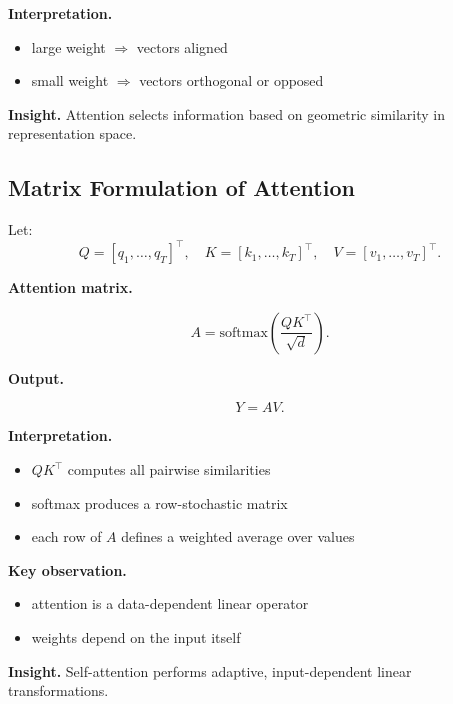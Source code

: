 \medskip

\noindent
\textbf{Interpretation.}

\begin{itemize}
    \item large weight $\Rightarrow$ vectors aligned
    \item small weight $\Rightarrow$ vectors orthogonal or opposed
\end{itemize}

\medskip

\noindent
\textbf{Insight.}  
Attention selects information based on geometric similarity in representation space.

\subsection{Matrix Formulation of Attention}

Let:
\[
Q = [q_1, \dots, q_T]^\top, \quad
K = [k_1, \dots, k_T]^\top, \quad
V = [v_1, \dots, v_T]^\top.
\]

\medskip

\noindent
\textbf{Attention matrix.}

\[
A = \text{softmax}\left( \frac{QK^\top}{\sqrt{d}} \right).
\]

\medskip

\noindent
\textbf{Output.}

\[
Y = A V.
\]

\medskip

\noindent
\textbf{Interpretation.}

\begin{itemize}
    \item $QK^\top$ computes all pairwise similarities
    \item softmax produces a row-stochastic matrix
    \item each row of $A$ defines a weighted average over values
\end{itemize}

\medskip

\noindent
\textbf{Key observation.}

\begin{itemize}
    \item attention is a data-dependent linear operator
    \item weights depend on the input itself
\end{itemize}

\medskip

\noindent
\textbf{Insight.}  
Self-attention performs adaptive, input-dependent linear transformations.

